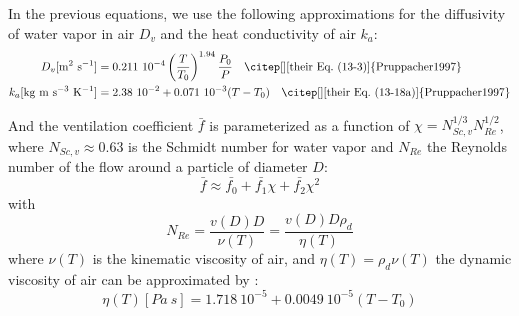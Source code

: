 {In the previous equations, we use the following approximations for the diffusivity of water vapor in air $D_v$ and the heat conductivity of air $k_a$:
\begin{align}
\label{Dv}
 D_v[\mathrm{m^2~s^{-1}}] &= 0.211~10^{-4} \left(\frac{T}{T_0}\right)^{1.94}\frac{P_0}{P} \quad \text{\citep[][their Eq.\ (13-3)]{Pruppacher1997}} \\
\label{ka}
 k_a[\mathrm{kg~m~s^{-3}~K^{-1}}] &= 2.38~10^{-2} + 0.071~10^{-3} (T-T_0) \quad \text{\citep[][their Eq.\ (13-18a)]{Pruppacher1997}} \\
\end{align}

And the ventilation coefficient $\bar{f}$ is parameterized as a function of $\chi=N_{Sc,v}^{1/3}N_{Re}^{1/2}$, where $N_{Sc,v} \approx 0.63$ is the Schmidt number for water vapor and $N_{Re}$ the Reynolds number of the flow around a particle of diameter $D$:
\begin{equation}
\label{f}
 \bar{f} \approx \bar{f_0} + \bar{f_1} \chi + \bar{f_2} \chi^2
\end{equation}
with
\begin{equation}
 N_{Re} = \frac{v(D)D}{\nu(T)} = \frac{v(D)D\rho_d}{\eta(T)}
\end{equation}
where $\nu(T)$ is the kinematic viscosity of air, and $\eta(T)=\rho_d \nu(T)$ the dynamic viscosity of air can be approximated by \citep[][their Eq.\ (10-141), converting with $1~poise = 0.1$~Pa~s]{Pruppacher1997}:
\begin{equation}
 \eta(T) [Pa~s] = 1.718~10^{-5} + 0.0049~10^{-5} (T-T_0)
\end{equation}

}
